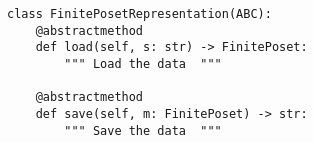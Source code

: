 \par\begin{minipage}{60ex}
\begin{verbatim}
class FinitePosetRepresentation(ABC):
    @abstractmethod
    def load(self, s: str) -> FinitePoset:
        """ Load the data  """

    @abstractmethod
    def save(self, m: FinitePoset) -> str:
        """ Save the data  """
\end{verbatim}
\end{minipage}\par